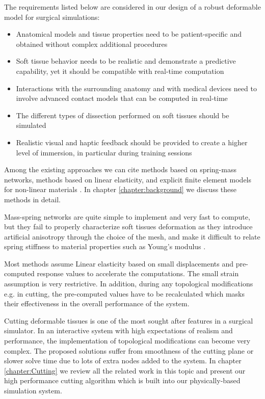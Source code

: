 The requirements listed below are considered in our design of a robust deformable 
model for surgical simulations:

\begin{itemize}
  \item Anatomical models and tissue properties need to be patient-specific and 
obtained without complex additional procedures
  \item Soft tissue behavior needs to be realistic and demonstrate a predictive capability, yet it should be 
  compatible with real-time computation
  \item Interactions with the surrounding anatomy and with medical devices need to involve advanced 
  contact models that can be computed in real-time
  \item The different types of dissection performed on soft tissues should be simulated
  \item Realistic visual and haptic feedback should be provided to create a higher level of immersion, in 
  particular during training sessions
\end{itemize}


Among the existing approaches we can cite methods based on spring-mass networks, methods based 
on linear elasticity, and explicit finite element models for non-linear materials 
\cite{Gibson1997a,Meier2005}. In chapter \ref{chapter:background} we discuss these methods in detail.  

Mass-spring networks are quite simple to implement and very fast to compute, but they fail to properly 
characterize soft tissues deformation as they introduce artificial anisotropy through the choice of the 
mesh, and make it difficult to relate spring stiffness to material properties such as Young's modulus 
\cite{Courtecuisse2010}.

Most methods assume Linear elasticity based on small displacements and pre-computed 
response values to accelerate the computations. The small strain assumption is very restrictive. In 
addition, during any topological modifications e.g. in cutting, the pre-computed values 
have to be recalculated which masks their effectiveness in the overall performance of the system.

Cutting deformable tissues is one of the most sought after features in a surgical simulator. In an interactive 
system with high expectations of realism and performance, the implementation of topological 
modifications can become very complex. The proposed solutions suffer from smoothness of the cutting 
plane or slower solve time due to lots of extra nodes added to the system. In chapter 
\ref{chapter:Cutting} we review all the related work in this topic and present our high performance 
cutting algorithm which is built into our physically-based simulation system.


